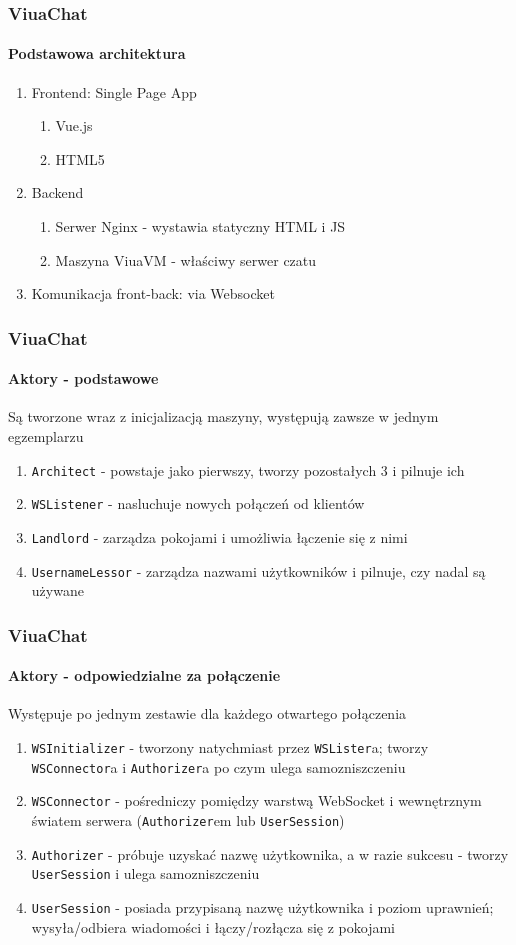 \documentclass{beamer}
\begin{document}
\begin{frame}
    \frametitle{ViuaChat}
    \framesubtitle{Podstawowa architektura}

    \begin{enumerate}
        \item Frontend: Single Page App
        \begin{enumerate}
        	\item Vue.js
        	\item HTML5
        \end{enumerate}
        \item Backend
        \begin{enumerate}
        	\item Serwer Nginx - wystawia statyczny HTML i JS
        	\item Maszyna ViuaVM - właściwy serwer czatu
        \end{enumerate}
        \item Komunikacja front-back: via Websocket
    \end{enumerate}
\end{frame}

\begin{frame}
    \frametitle{ViuaChat}
    \framesubtitle{Aktory - podstawowe}
	Są tworzone wraz z inicjalizacją maszyny, występują zawsze w jednym egzemplarzu

    \begin{enumerate}
    	\item \texttt{Architect} - powstaje jako pierwszy, tworzy pozostałych 3 i pilnuje ich
        \item \texttt{WSListener} - nasluchuje nowych połączeń od klientów
        \item \texttt{Landlord} - zarządza pokojami i umożliwia łączenie się z nimi
        \item \texttt{UsernameLessor} - zarządza nazwami użytkowników i pilnuje, czy nadal są używane
    \end{enumerate}
\end{frame}

\begin{frame}
    \frametitle{ViuaChat}
    \framesubtitle{Aktory - odpowiedzialne za połączenie}
	Występuje po jednym zestawie dla każdego otwartego połączenia

    \begin{enumerate}
    	\item \texttt{WSInitializer} - tworzony natychmiast przez \texttt{WSLister}a; tworzy \texttt{WSConnector}a i \texttt{Authorizer}a po czym ulega samozniszczeniu
    	\item \texttt{WSConnector} - pośredniczy pomiędzy warstwą WebSocket i wewnętrznym światem serwera (\texttt{Authorizer}em lub \texttt{UserSession})
        \item \texttt{Authorizer} - próbuje uzyskać nazwę użytkownika, a w razie sukcesu - tworzy \texttt{UserSession} i ulega samozniszczeniu
        \item \texttt{UserSession} - posiada przypisaną nazwę użytkownika i poziom uprawnień; wysyła/odbiera wiadomości i łączy/rozłącza się z pokojami
    \end{enumerate}
\end{frame}
\end{document}
